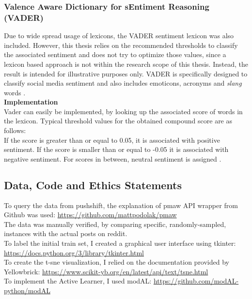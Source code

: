 \documentclass[11pt, a4paper]{article}
\begin{document}
\subsubsection{Valence Aware Dictionary for sEntiment Reasoning (VADER)} \label{subs:vader}
Due to wide spread usage of lexicons, the VADER sentiment lexicon was also included. However, this thesis relies on the recommended 
thresholds to classify the associated sentiment and does not try to optimize those values, since a lexicon based approach is not within the research scope of this thesis. Instead, the result is intended for illustrative purposes only.
VADER is specifically designed to classify social media sentiment and also includes emoticons, acronyms and \emph{slang} words \citep{hutto2015vader}. \\

\noindent\textbf{Implementation}\\
Vader can easily be implemented, by looking up the associated score of words in the lexicon. Typical threshold values for the obtained compound score are as follows:\\
If the score is greater than or equal to 0.05, it is associated with positive sentiment. If the score is smaller than or equal to -0.05 it is associated with negative sentiment. For scores
in between, neutral sentiment is assigned \citep{hutto2015vader}.

\subsection{Data, Code and Ethics Statements} \label{datacodeethics}
To query the data from pushshift, the explanation of pmaw API wrapper from Github was used: \url{https://github.com/mattpodolak/pmaw}\\
The data was manually verified, by comparing specific, randomly-sampled, instances with the actual posts on reddit.\\

\noindent To label the initial train set, I created a graphical user interface using tkinter: \url{https://docs.python.org/3/library/tkinter.html}\\

\noindent To create the t-sne visualization, I relied on the documentation provided by Yellowbrick: \url{https://www.scikit-yb.org/en/latest/api/text/tsne.html}\\

\noindent To implement the Active Learner, I used modAL: \url{https://github.com/modAL-python/modAL}\\
\end{document}
